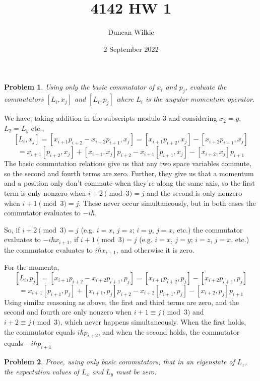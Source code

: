\documentclass{article}
\title{4142 HW 1}
\author{Duncan Wilkie}
\date{2 September 2022}
\newtheorem{prob}{Problem}
\begin{document}
\maketitle

\begin{prob}
  Using only the basic commutator of $x_{i}$ and $p_{j}$, evaluate the commutators $[L_{i}, x_{j}]$ and $[L_{i}, p_{j}]$
  where $L_{i}$ is the angular momentum operator.
\end{prob}

We have, taking addition in the subscripts modulo 3 and considering $x_{2}=y$, $L_{2}=L_{y}$ etc.,
\[
  [L_{i}, x_{j}] = [x_{i+1}p_{i+2}-x_{i+2}p_{i+1}, x_{j}] = [x_{i+1}p_{i+2}, x_{j}] - [x_{i+2}p_{i+1}, x_{j}]
\]
\[
  = x_{i+1}[p_{i+2}, x_{j}] + [x_{i+1}, x_{j}]p_{i+2} - x_{i+1}[p_{i+1}, x_{j}] - [x_{i+2}, x_{j}]p_{i+1}
\]
The basic commutation relations give us that any two space variables commute, so the second and fourth terms are zero.
Further, they give us that a momentum and a position only don't commute when they're along the same axis,
so the first term is only nonzero when $i+2\pmod 3 = j$ and the second is only nonzero when $i+1\pmod 3 = j$.
These never occur simultaneously, but in both cases the commutator evaluates to $-i\hbar$.

So, if $i+2\pmod 3 = j$ (e.g. $i=x$, $j=z$; $i=y$, $j=x$, etc.) the commutator evaluates to $-i\hbar x_{i+1}$,
if $i+1\pmod 3 = j$ (e.g. $i=x$, $j=y$; $i=z$, $j=x$, etc.) the commutator evaluates to $i\hbar x_{i+1}$,
and otherwise it is zero.

For the momenta,
\[
  [L_{i},p_{j}] = [x_{i+1}p_{i+2} - x_{i+2}p_{i+1}, p_{j}] = [x_{i+1}p_{i+2}, p_{j}] - [x_{i+2}p_{i+1}, p_{j}]
\]
\[
  = x_{i+1}[p_{i+1}, p_{j}] + [x_{i+1}, p_{j}]p_{i+2} - x_{i+2}[p_{i+1}, p_{j}] - [x_{i+2}, p_{j}]p_{i+1}
\]
Using similar reasoning as above, the first and third terms are zero, and the second and fourth are only nonzero when $i+1\equiv j\pmod 3$
and $i+2 \equiv j \pmod 3$, which never happens simultaneously.
When the first holds, the commutator equals $i\hbar p_{i+2}$, and when the second holds, the commutator equals $-i\hbar p_{i+1}$

\begin{prob}
  Prove, using only basic commutators, that in an eigenstate of $L_{z}$, the expectation values of $L_{x}$ and $L_{y}$ must be zero.
\end{prob}
\end{document}
